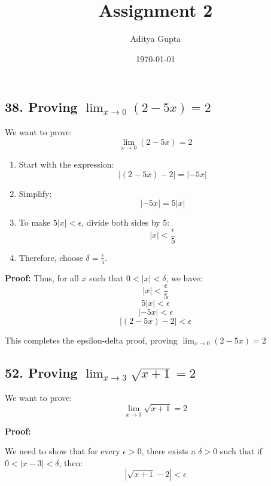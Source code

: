 \documentclass{article}
\begin{document}
\graphicspath{ {./Images/} }
\title{Assignment 2}
\author{Aditya Gupta}
\date{\today}
\maketitle


\subsection*{38. Proving \( \lim_{x \to 0} (2 - 5x) = 2 \)}

We want to prove:
\[
\lim_{x \to 0} (2 - 5x) = 2
\]


\begin{enumerate}
    \item Start with the expression:
    \[
    |(2 - 5x) - 2| = |-5x|
    \]
    
    \item Simplify:
    \[
    |-5x| = 5|x|
    \]
    
    \item To make \(5|x| < \epsilon\), divide both sides by 5:
    \[
    |x| < \frac{\epsilon}{5}
    \]
    
    \item Therefore, choose \(\delta = \frac{\epsilon}{5}\).
    
\end{enumerate}

\textbf{Proof:}
Thus, for all \(x\) such that \(0 < |x| < \delta\), we have:
\[
|x| < \frac{\epsilon}{5}
\]
\[
5|x| < \epsilon
\]
\[
|-5x| < \epsilon
\]
\[
|(2 - 5x) - 2| < \epsilon
\]


This completes the epsilon-delta proof, proving $
\lim_{x \to 0} (2 - 5x) = 2
$

\subsection*{52. Proving \( \lim_{x \to 3} \sqrt{x+1} = 2 \)}

We want to prove:
\[
\lim_{x \to 3} \sqrt{x + 1} = 2
\]

\textbf{Proof:}

We need to show that for every \( \epsilon > 0 \), there exists a \( \delta > 0 \) such that if \( 0 < |x - 3| < \delta \), then:
\[
|\sqrt{x + 1} - 2| < \epsilon
\]
\end{document}
